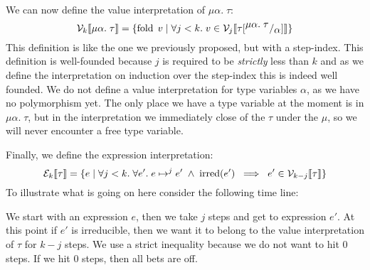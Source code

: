 We can now define the value interpretation of $\mu\alpha. \; \tau$:
\[
  \vpres{\mu\alpha.\; \tau} = \{\fold \; v \vbar \forall j < k. \; v \in \vpres[j]{\sub{\tau}{\mu\alpha.\;\tau}{\alpha}} \}
\]
This definition is like the one we previously proposed, but with a step-index. This definition is well-founded because $j$ is required to be \emph{strictly} less than $k$ and as we define the interpretation on induction over the step-index this is indeed well founded. We do not define a value interpretation for type variables $\alpha$, as we have no polymorphism yet. The only place we have a type variable at the moment is in $\mu\alpha. \; \tau$, but in the interpretation we immediately close of the $\tau$ under the $\mu$, so we will never encounter a free type variable.

Finally, we define the expression interpretation:
\[
  \epres{\tau} = \{e \vbar \forall j < k. \; \forall e'. \; e \evaltos[j] e' \pand \irred(e') \; \implies \; e' \in \vpres[k-j]{\tau}\}
\]
To illustrate what is going on here consider the following time line: \\
\begin{center}
\end{center}
We start with an expression $e$, then we take $j$ steps and get to expression $e'$. At this point if $e'$ is irreducible, then we want it to belong to the value interpretation of $\tau$ for $k-j$ steps. We use a strict inequality because we do not want to hit 0 steps. If we hit 0 steps, then all bets are off.%

